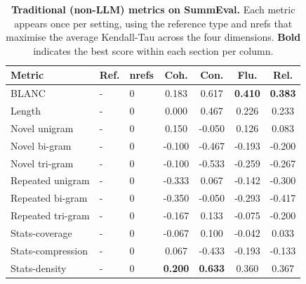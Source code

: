 \begin{table}[h!]
\vspace{1em}

\begin{subtable}[t]{\textwidth}
\centering
\begin{tabular}{lllcccc}
\toprule
\textbf{Metric} & \textbf{Ref.} & \textbf{nrefs}
  & \textbf{Coh.} & \textbf{Con.} & \textbf{Flu.} & \textbf{Rel.} \\
\midrule
\rowcolor{reffree}
BLANC & - & 0 & 0.183 & 0.617 & \textbf{0.410} & \textbf{0.383} \\
\rowcolor{reffree}
Length & - & 0 & 0.000 & 0.467 & 0.226 & 0.233 \\
\rowcolor{reffree}
Novel unigram & - & 0 & 0.150 & -0.050 & 0.126 & 0.083 \\
\rowcolor{reffree}
Novel bi-gram & - & 0 & -0.100 & -0.467 & -0.193 & -0.200 \\
\rowcolor{reffree}
Novel tri-gram & - & 0 & -0.100 & -0.533 & -0.259 & -0.267 \\
\rowcolor{reffree}
Repeated unigram & - & 0 & -0.333 & 0.067 & -0.142 & -0.300 \\
\rowcolor{reffree}
Repeated bi-gram & - & 0 & -0.350 & -0.050 & -0.293 & -0.417 \\
\rowcolor{reffree}
Repeated tri-gram & - & 0 & -0.167 & 0.133 & -0.075 & -0.200 \\
\rowcolor{reffree}
Stats-coverage & - & 0 & -0.067 & 0.100 & -0.042 & 0.033 \\
\rowcolor{reffree}
Stats-compression & - & 0 & 0.067 & -0.433 & -0.193 & -0.133 \\
\rowcolor{reffree}
Stats-density & - & 0 & \textbf{0.200} & \textbf{0.633} & 0.360 & 0.367 \\
\bottomrule
\end{tabular}
\caption{Reference-free: nrefs\,=\,0.}
\label{tab:traditional_metrics-reffree}
\end{subtable}
\caption[Traditional (non-LLM) metrics on SummEval.]{%
  \textbf{Traditional (non-LLM) metrics on SummEval.}
  Each metric appears once per setting, using the reference type and nrefs that
  maximise the average Kendall-Tau across the four dimensions.
  \textbf{Bold} indicates the best score within each section per column.
}
\label{tab:traditional_metrics}
\end{table}